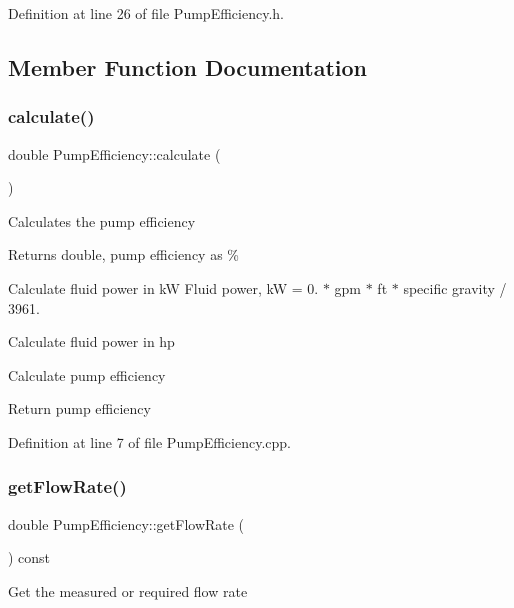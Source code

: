 Definition at line 26 of file Pump\+Efficiency.\+h.



\subsection{Member Function Documentation}
\mbox{\label{class_pump_efficiency_ab45de46019ff182d4f11810b2791a8c9}} 
\subsubsection{\texorpdfstring{calculate()}{calculate()}}
{\footnotesize\ttfamily double Pump\+Efficiency\+::calculate (\begin{DoxyParamCaption}{ }\end{DoxyParamCaption})}

Calculates the pump efficiency

\begin{DoxyReturn}{Returns}
double, pump efficiency as \% 
\end{DoxyReturn}
Calculate fluid power in kW Fluid power, kW = 0. $\ast$ gpm $\ast$ ft $\ast$ specific gravity / 3961.

Calculate fluid power in hp

Calculate pump efficiency

Return pump efficiency

Definition at line 7 of file Pump\+Efficiency.\+cpp.

\mbox{\label{class_pump_efficiency_a715c4ade497e99640f09546fad6479bc}} 
\subsubsection{\texorpdfstring{get\+Flow\+Rate()}{getFlowRate()}}
{\footnotesize\ttfamily double Pump\+Efficiency\+::get\+Flow\+Rate (\begin{DoxyParamCaption}{ }\end{DoxyParamCaption}) const\hspace{0.3cm}{\ttfamily [inline]}}

Get the measured or required flow rate

